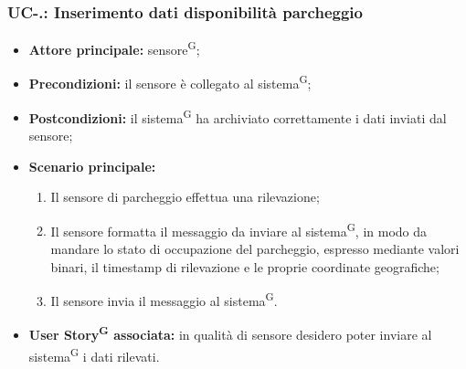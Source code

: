 \documentclass[8pt]{article}
\newcommand{\glossterm}[1]{#1\textsuperscript{G}} %
\begin{document}
\subsubsection*{UC-\theuc .\speconenumber: Inserimento dati disponibilità parcheggio}
\begin{itemize}
    \item \textbf{Attore principale:} \glossterm{sensore};
    \item \textbf{Precondizioni:} il sensore è collegato al \glossterm{sistema};
    \item \textbf{Postcondizioni:} il \glossterm{sistema} ha archiviato correttamente i dati inviati dal sensore;
    \item \textbf{Scenario principale:}
        \begin{enumerate}
        \item Il sensore di parcheggio effettua una rilevazione;
        \item Il sensore formatta il messaggio da inviare al \glossterm{sistema}, in modo da mandare lo stato di occupazione del parcheggio, espresso mediante valori binari, il timestamp di rilevazione e le proprie coordinate geografiche;
        \item Il sensore invia il messaggio al \glossterm{sistema}.
        \end{enumerate}
    \item \textbf{\glossterm{User Story} associata:} in qualità di sensore desidero poter inviare al \glossterm{sistema} i dati rilevati.
\end{itemize}
\end{document}
